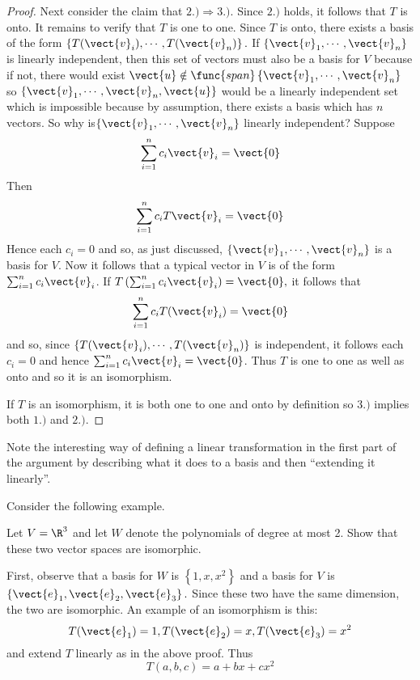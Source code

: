\begin{proof}
Next consider the claim that $2.)\Rightarrow 3.).$ Since $2.)$ holds, it
follows that $T$ is onto. It remains to verify that $T$ is one to one. Since 
$T$ is onto, there exists a basis of the form $\left\{ T(\vect{v}_{i}),\cdots ,T
(\vect{v}_{n})\right\} .$ If $\left\{ \vect{v}_{1},\cdots ,\vect{v}_{n}\right\} $
is linearly independent, then this set of vectors must also be a basis for $
V $ because if not, there would exist $\vect{u}\notin \func{span}\left\{ \vect{
v}_{1},\cdots ,\vect{v}_{n}\right\} $ so $\left\{ \vect{v}_{1},\cdots ,\vect{v}
_{n},\vect{u}\right\} $ would be a linearly independent set which is
impossible because by assumption, there exists a basis which has $n$
vectors. So why is$\left\{ \vect{v}_{1},\cdots ,\vect{v}_{n}\right\} $
linearly independent? Suppose 
\begin{equation*}
\sum_{i=1}^{n}c_{i}\vect{v}_{i}=\vect{0}
\end{equation*}
Then
\begin{equation*}
\sum_{i=1}^{n}c_{i}T\vect{v}_{i}=\vect{0}
\end{equation*}
Hence each $c_{i}=0$ and so, as just discussed, $\left\{ \vect{v}_{1},\cdots ,
\vect{v}_{n}\right\} $ is a basis for $V$. Now it follows that a typical
vector in $V$ is of the form $\sum_{i=1}^{n}c_{i}\vect{v}_{i}$. If $T\left(
\sum_{i=1}^{n}c_{i}\vect{v}_{i}\right) =\vect{0},$ it follows that 
\begin{equation*}
\sum_{i=1}^{n}c_{i}T(\vect{v}_{i})=\vect{0}
\end{equation*}
and so, since $\left\{ T(\vect{v}_{i}),\cdots ,T(\vect{v}_{n})\right\} $ is
independent, it follows each $c_{i}=0$ and hence $\sum_{i=1}^{n}c_{i}\vect{v}
_{i}=\vect{0}$. Thus $T$ is one to one as well as onto and so it is an
isomorphism.

If $T$ is an isomorphism, it is both one to one and onto by definition so $
3.)$ implies both $1.)$ and $2.)$.
\end{proof}

Note the interesting way of defining a linear transformation in the first
part of the argument by describing what it does to a basis and then
``extending it linearly''.

Consider the following example. 

\begin{example}{}{}
Let $V=\R^{3}$ and let $W$ denote the polynomials of degree at most
2. Show that these two vector spaces are isomorphic.
\end{example}

\begin{solution}
First, observe that a basis for $W$ is $\left\{ 1,x,x^{2}\right\} $ and a basis for $V$
is $\left\{ \vect{e}_{1},\vect{e}_{2},\vect{e}_{3}\right\} .$ Since these two
have the same dimension, the two are
isomorphic. An example of an isomorphism is this:\ 
\begin{equation*}
T(\vect{e}_{1})=1,T(\vect{e}_{2})=x,T(\vect{e}_{3})=x^{2}
\end{equation*}
and extend $T$ linearly as in the above proof. Thus 
\begin{equation*}
T\left( a,b,c\right) =a+bx+cx^{2}
\end{equation*}
\end{solution}

